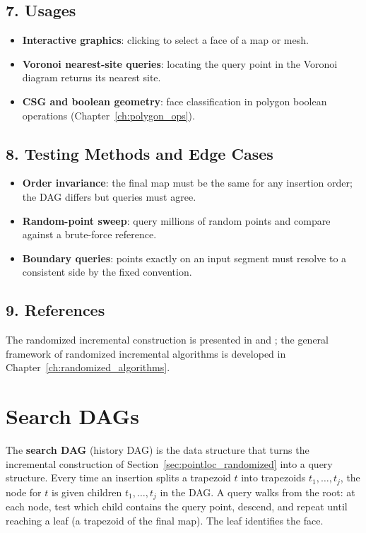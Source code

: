 \subsection{7. Usages}

\begin{itemize}
\item \textbf{Interactive graphics}: clicking to select a face of a map or
  mesh.
\item \textbf{Voronoi nearest-site queries}: locating the query point in
  the Voronoi diagram returns its nearest site.
\item \textbf{CSG and boolean geometry}: face classification in polygon
  boolean operations (Chapter~\ref{ch:polygon_ops}).
\end{itemize}

\subsection{8. Testing Methods and Edge Cases}

\begin{itemize}
\item \textbf{Order invariance}: the final map must be the same for any
  insertion order; the DAG differs but queries must agree.
\item \textbf{Random-point sweep}: query millions of random points and
  compare against a brute-force reference.
\item \textbf{Boundary queries}: points exactly on an input segment must
  resolve to a consistent side by the fixed convention.
\end{itemize}

\subsection{9. References}

The randomized incremental construction is presented in \cite{seidel1991}
and \cite{berg2008}; the general framework of randomized incremental
algorithms is developed in Chapter~\ref{ch:randomized_algorithms}.

\section{Search DAGs}
\label{sec:pointloc_search_dags}

The \textbf{search DAG} (history DAG) is the data
structure that turns the incremental construction of
Section~\ref{sec:pointloc_randomized} into a query structure. Every time an
insertion splits a trapezoid $t$ into trapezoids $t_1,\dots,t_j$, the node
for $t$ is given children $t_1,\dots,t_j$ in the DAG. A query walks from
the root: at each node, test which child contains the query point, descend,
and repeat until reaching a leaf (a trapezoid of the final map). The leaf
identifies the face.

